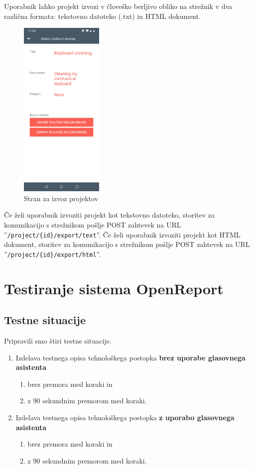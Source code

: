 \documentclass[a4paper, 12pt]{book}
\begin{document}
Uporabnik lahko projekt izvozi v človeško berljivo obliko na strežnik v dva različna formata: tekstovno datoteko (.txt) in HTML dokument.

\begin{figure}[H]
\begin{center}
	\includegraphics[width=4cm]{app_project_export}
\end{center}
	\caption{Stran za izvoz projektov}
\label{app_project_export}
\end{figure}

Če želi uporabnik izvoziti projekt kot tekstovno datoteko, storitev za komunikacijo s strežnikom pošlje POST zahtevek na URL ''\texttt{/project/\{id\}/export/text}''.
Če želi uporabnik izvoziti projekt kot HTML dokument, storitev za komunikacijo s strežnikom pošlje POST zahtevek na URL ''\texttt{/project/\{id\}/export/html}''.

\section{Testiranje sistema OpenReport}

\subsection{Testne situacije}

Pripravili smo štiri testne situacije.

\begin{enumerate}
	\item Izdelava testnega opisa tehnološkega postopka \textbf{brez uporabe glasovnega asistenta}
		\begin{enumerate}
			\item brez premora med koraki in
			\item z 90 sekundnim premorom med koraki.
		\end{enumerate}
	\item Izdelava testnega opisa tehnološkega postopka \textbf{z uporabo glasovnega asistenta}
		\begin{enumerate}
			\item brez premora med koraki in
			\item z 90 sekundnim premorom med koraki.
		\end{enumerate}
\end{enumerate}
\end{document}
